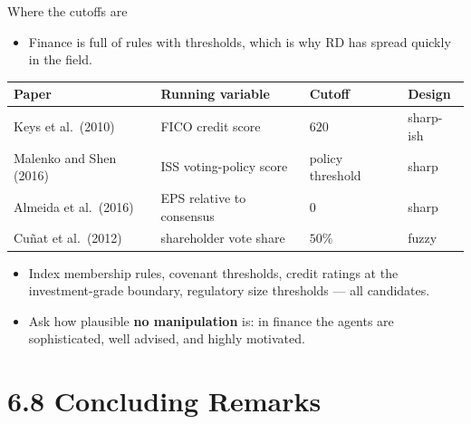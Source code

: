 \documentclass[
  11pt,
  ignorenonframetext,
  aspectratio=169,
]{beamer}
\providecommand{\tightlist}{%
  \setlength{\itemsep}{0pt}\setlength{\parskip}{0pt}}
\begin{document}
\begin{frame}{Where the cutoffs are}
\protect{}\label{where-the-cutoffs-are}
\begin{itemize}
\tightlist
\item
  Finance is full of rules with thresholds, which is why RD has spread
  quickly in the field.
\end{itemize}

\begin{center}
\small
\begin{tabular}{llll}
\toprule
Paper & Running variable & Cutoff & Design  \\
\midrule
Keys et al.\ (2010)       & FICO credit score  & $620$   & sharp-ish \\
Malenko and Shen (2016)   & ISS voting-policy score & policy threshold & sharp \\
Almeida et al.\ (2016)    & EPS relative to consensus & $0$ & sharp \\
Cu\~nat et al.\ (2012)    & shareholder vote share & $50\%$ & fuzzy \\
\bottomrule
\end{tabular}
\end{center}

\begin{itemize}
\tightlist
\item
  Index membership rules, covenant thresholds, credit ratings at the
  investment-grade boundary, regulatory size thresholds --- all
  candidates.
\item
  Ask how plausible \textbf{no manipulation} is: in finance the agents
  are sophisticated, well advised, and highly motivated.
\end{itemize}
\end{frame}

\section{6.8 Concluding Remarks}\label{concluding-remarks}
\end{document}
